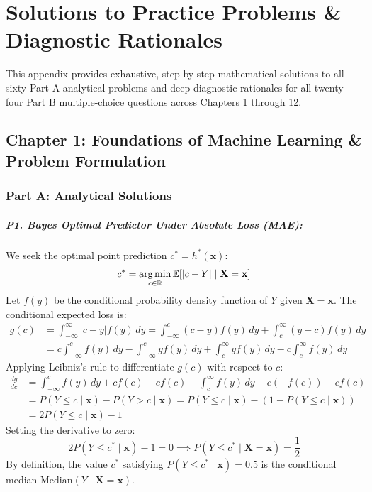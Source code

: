 \chapter{Solutions to Practice Problems \& Diagnostic Rationales}
\label{chap:appendix}

This appendix provides exhaustive, step-by-step mathematical solutions to all sixty Part A analytical problems and deep diagnostic rationales for all twenty-four Part B multiple-choice questions across Chapters 1 through 12.

\section*{Chapter 1: Foundations of Machine Learning \& Problem Formulation}

\subsection*{Part A: Analytical Solutions}

\paragraph{P1. Bayes Optimal Predictor Under Absolute Loss (MAE):}
We seek the optimal point prediction $c^* = h^*(\mathbf{x})$:
\[
c^* = \operatorname*{arg\,min}_{c \in \mathbb{R}} \operatorname{\mathbb{E}}[|c - Y| \mid \mathbf{X} = \mathbf{x}]
\]
Let $f(y)$ be the conditional probability density function of $Y$ given $\mathbf{X} = \mathbf{x}$. The conditional expected loss is:
\begin{align*}
g(c) &= \int_{-\infty}^\infty |c - y| f(y) \, dy = \int_{-\infty}^c (c - y) f(y) \, dy + \int_c^\infty (y - c) f(y) \, dy \\
&= c \int_{-\infty}^c f(y) \, dy - \int_{-\infty}^c y f(y) \, dy + \int_c^\infty y f(y) \, dy - c \int_c^\infty f(y) \, dy
\end{align*}
Applying Leibniz's rule to differentiate $g(c)$ with respect to $c$:
\begin{align*}
\frac{dg}{dc} &= \int_{-\infty}^c f(y) \, dy + c f(c) - c f(c) - \int_c^\infty f(y) \, dy - c(-f(c)) - c f(c) \\
&= P(Y \le c \mid \mathbf{x}) - P(Y > c \mid \mathbf{x}) = P(Y \le c \mid \mathbf{x}) - (1 - P(Y \le c \mid \mathbf{x})) \\
&= 2 P(Y \le c \mid \mathbf{x}) - 1
\end{align*}
Setting the derivative to zero:
\begin{equation*}
2 P(Y \le c^* \mid \mathbf{x}) - 1 = 0 \implies P(Y \le c^* \mid \mathbf{X} = \mathbf{x}) = \frac{1}{2}
\end{equation*}
By definition, the value $c^*$ satisfying $P(Y \le c^* \mid \mathbf{x}) = 0.5$ is the conditional median $\text{Median}(Y \mid \mathbf{X} = \mathbf{x})$.

